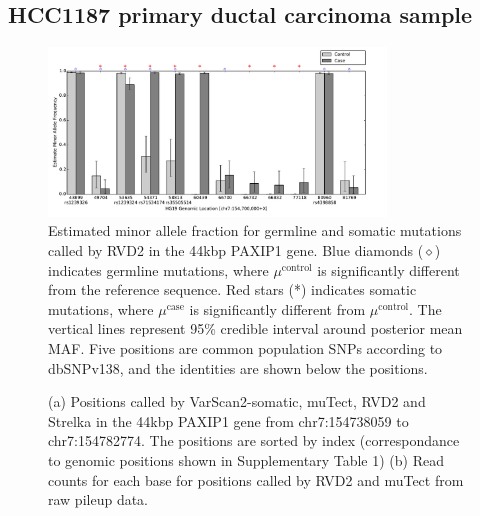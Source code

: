 \documentclass{bioinfo}
\begin{document}
\subsection{HCC1187 primary ductal carcinoma sample}\label{sec:brca}
\begin{figure}[!hbpt]
\centering
\vspace{-10pt}
\includegraphics[width=0.8\textwidth]{pdf_figs/HCC1187_MuBarPlot.pdf}
\caption{Estimated minor allele fraction for germline and somatic mutations called by RVD2 in the 44kbp PAXIP1 gene. Blue diamonds ($\diamond$) indicates germline mutations, where $\mu^{\text{control}}$ is significantly different from the reference sequence. Red stars (*) indicates somatic mutations, where $\mu^{\text{case}}$ is significantly different from $ \mu^{\text{control}}$. The  vertical lines represent 95\% credible interval around posterior mean MAF. Five positions are common population SNPs according to dbSNPv138, and the identities are shown below the positions.}
\vspace{-10pt}
\label{fig:brca_MAF}
\end{figure}

\begin{figure}[!pthb]
\vspace{-10pt}
    \centering
    \caption{(a) Positions called by VarScan2-somatic, muTect, RVD2 and Strelka in the 44kbp PAXIP1 gene from chr7:154738059 to chr7:154782774. The positions are sorted by index (correspondance to genomic positions shown in Supplementary Table 1) (b) Read counts for each base for positions called by RVD2 and muTect from raw pileup data.}%
    \label{fig:brca_dot}%
\vspace{-10pt}
\end{figure}
\end{document}
